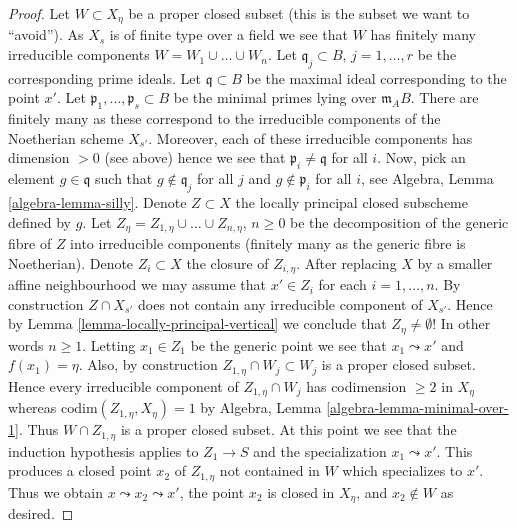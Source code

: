 \begin{proof}
\medskip\noindent
Let $W \subset X_\eta$ be a proper closed subset (this is the
subset we want to ``avoid''). As $X_s$ is of finite type over a field
we see that $W$ has finitely many irreducible components
$W = W_1 \cup \ldots \cup W_n$. Let
$\mathfrak q_j \subset B$, $j = 1, \ldots, r$
be the corresponding prime ideals. Let $\mathfrak q \subset B$
be the maximal ideal corresponding to the point $x'$.
Let $\mathfrak p_1, \ldots, \mathfrak p_s \subset B$ be the
minimal primes lying over $\mathfrak m_AB$. There are finitely
many as these correspond to the irreducible components of the
Noetherian scheme $X_{s'}$. Moreover, each of these irreducible
components has dimension $> 0$ (see above) hence we see that
$\mathfrak p_i \not = \mathfrak q$ for all $i$.
Now, pick an element $g \in \mathfrak q$ such that
$g \not \in \mathfrak q_j$ for all $j$ and $g \not \in \mathfrak p_i$
for all $i$, see
Algebra, Lemma \ref{algebra-lemma-silly}.
Denote $Z \subset X$ the locally principal closed subscheme defined by $g$.
Let $Z_\eta = Z_{1, \eta} \cup \ldots \cup Z_{n, \eta}$, $n \geq 0$
be the decomposition of the generic fibre of $Z$ into irreducible
components (finitely many as the generic fibre is Noetherian).
Denote $Z_i \subset X$ the closure of $Z_{i, \eta}$.
After replacing $X$ by a smaller affine neighbourhood
we may assume that $x' \in Z_i$ for each $i = 1, \ldots, n$.
By construction $Z \cap X_{s'}$ does not contain any irreducible
component of $X_{s'}$. Hence by
Lemma \ref{lemma-locally-principal-vertical}
we conclude that $Z_\eta \not = \emptyset$! In other words
$n \geq 1$. Letting $x_1 \in Z_1$ be the generic point we see
that $x_1 \leadsto x'$ and $f(x_1) = \eta$.
Also, by construction $Z_{1, \eta} \cap W_j \subset W_j$
is a proper closed subset. Hence every irreducible component of
$Z_{1, \eta} \cap W_j$ has codimension $\geq 2$ in $X_\eta$
whereas $\text{codim}(Z_{1, \eta}, X_\eta) = 1$ by
Algebra, Lemma \ref{algebra-lemma-minimal-over-1}.
Thus $W \cap Z_{1, \eta}$ is a proper closed subset.
At this point we see that the induction hypothesis applies to
$Z_1 \to S$ and the specialization $x_1 \leadsto x'$.
This produces a closed point $x_2$ of $Z_{1, \eta}$ not contained
in $W$ which specializes to $x'$. Thus we obtain
$x \leadsto x_2 \leadsto x'$, the point $x_2$ is closed in $X_\eta$,
and $x_2 \not \in W$ as desired.
\end{proof}